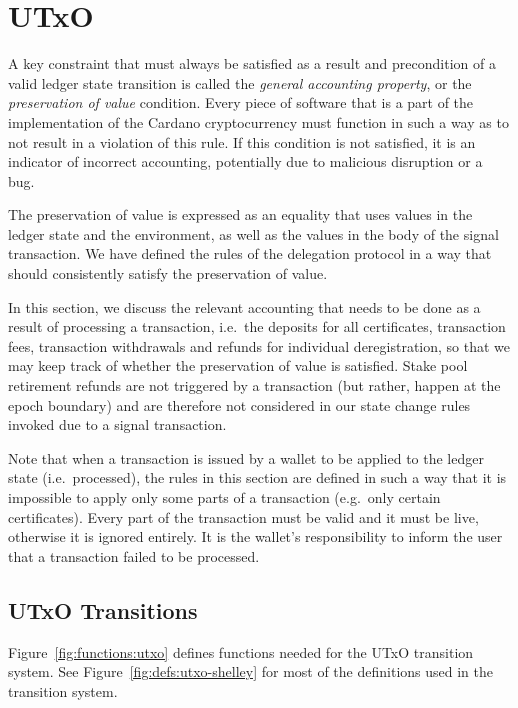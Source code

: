 \section{UTxO}
\label{sec:utxo}

A key constraint that must always be satisfied as a result and precondition of
a valid ledger state transition is called the \textit{general accounting
property}, or the \textit{preservation of value} condition. Every piece of
software that is a part of the implementation of the
Cardano cryptocurrency must function in such a way as to not result in
a violation of this rule.
If this condition is not satisfied, it is an indicator of
incorrect accounting, potentially due to
malicious disruption or a bug.

The preservation of value is expressed as an equality that uses values in
the ledger state and the environment, as well as the values in the body of
the signal transaction.
We have defined the rules of the delegation protocol in a way that should
consistently satisfy the preservation of value.

In this section, we discuss the relevant accounting that needs to be done
as a result of processing a transaction, i.e.~the deposits for all certificates,
transaction fees, transaction withdrawals and refunds for individual
deregistration, so that we may keep track of whether the preservation of
value is satisfied. Stake pool retirement refunds are not triggered by a
transaction (but rather, happen at the epoch boundary) and are therefore
not considered in our state change rules invoked due to a signal transaction.

Note that when a transaction is issued by a wallet to be applied to the ledger
state (i.e.~processed), the rules in this section are defined in such a way that it is impossible to
apply only some parts of a transaction (e.g.~only certain certificates).
Every part of the transaction must be valid and it must be live, otherwise
it is ignored entirely. It is the wallet's responsibility to inform the user
that a transaction failed to be processed.

\subsection{UTxO Transitions}
\label{sec:utxo-trans}

Figure~\ref{fig:functions:utxo} defines functions needed for the UTxO transition system.
See Figure~\ref{fig:defs:utxo-shelley} for most of the definitions used in the transition system.

